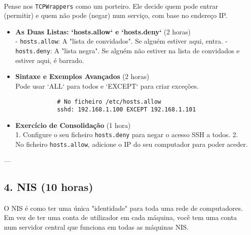 \documentclass[10pt,a4paper]{article}
\begin{document}
	\paragraph{}
	Pense nos \texttt{TCPWrappers} como um porteiro. Ele decide quem pode entrar (permitir) e quem não pode (negar) num serviço, com base no endereço IP.
	
	\begin{itemize}
		\item \textbf{As Duas Listas: `hosts.allow` e `hosts.deny`} (2 horas) \\
		- \texttt{hosts.allow}: A "lista de convidados". Se alguém estiver aqui, entra.
		- \texttt{hosts.deny}: A "lista negra". Se alguém não estiver na lista de convidados e estiver aqui, é barrado.
		
		\item \textbf{Sintaxe e Exemplos Avançados} (2 horas) \\
		Pode usar `ALL` para todos e `EXCEPT` para criar exceções.
		\begin{verbatim}
			# No ficheiro /etc/hosts.allow
			sshd: 192.168.1.100 EXCEPT 192.168.1.101
		\end{verbatim}
		
		\item \textbf{Exercício de Consolidação} (1 hora) \\
		1. Configure o seu ficheiro \texttt{hosts.deny} para negar o acesso SSH a todos.
		2. No ficheiro \texttt{hosts.allow}, adicione o IP do seu computador para poder aceder.
	\end{itemize}
	
	---
	
	\subsection*{4. NIS (10 horas)}
	\vspace{-1.2em}
	\paragraph{}
	O NIS é como ter uma única "identidade" para toda uma rede de computadores. Em vez de ter uma conta de utilizador em cada máquina, você tem uma conta num servidor central que funciona em todas as máquinas NIS.
	
\end{document}

